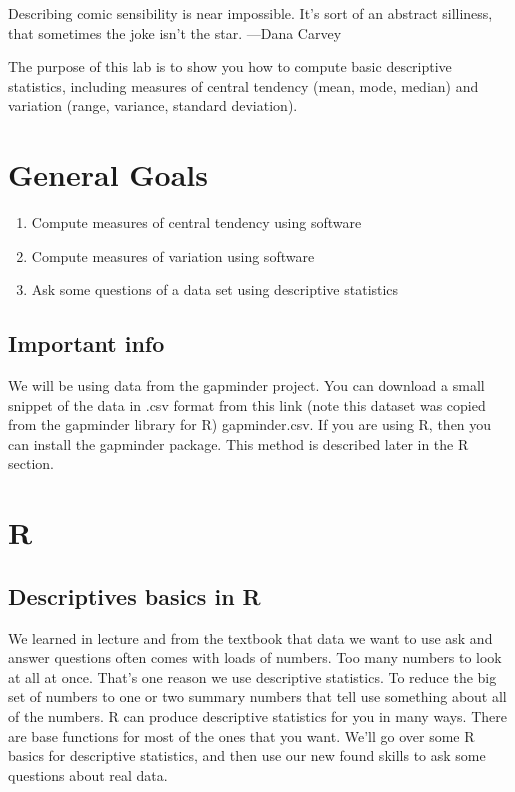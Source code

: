 \documentclass[]{book}
\providecommand{\tightlist}{%
  \setlength{\itemsep}{0pt}\setlength{\parskip}{0pt}}
\begin{document}
{ Describing comic sensibility is near impossible. It's sort of an
abstract silliness, that sometimes the joke isn't the star. ---Dana
Carvey }

The purpose of this lab is to show you how to compute basic descriptive
statistics, including measures of central tendency (mean, mode, median)
and variation (range, variance, standard deviation).

\section{General Goals}\label{general-goals-1}

\begin{enumerate}
\def\labelenumi{\arabic{enumi}.}
\tightlist
\item
  Compute measures of central tendency using software
\item
  Compute measures of variation using software
\item
  Ask some questions of a data set using descriptive statistics
\end{enumerate}

\subsection{Important info}\label{important-info-1}

We will be using data from the gapminder project. You can download a
small snippet of the data in .csv format from this link (note this
dataset was copied from the gapminder library for R) gapminder.csv. If
you are using R, then you can install the gapminder package. This method
is described later in the R section.

\section{R}\label{r-2}

\subsection{Descriptives basics in R}\label{descriptives-basics-in-r}

We learned in lecture and from the textbook that data we want to use ask
and answer questions often comes with loads of numbers. Too many numbers
to look at all at once. That's one reason we use descriptive statistics.
To reduce the big set of numbers to one or two summary numbers that tell
use something about all of the numbers. R can produce descriptive
statistics for you in many ways. There are base functions for most of
the ones that you want. We'll go over some R basics for descriptive
statistics, and then use our new found skills to ask some questions
about real data.
\end{document}
